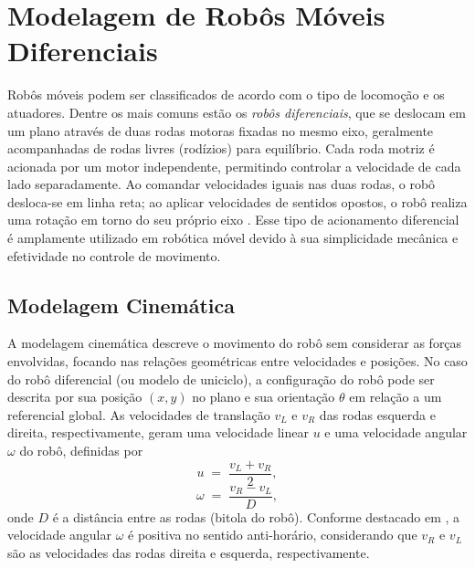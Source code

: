 
\section{Modelagem de Robôs Móveis Diferenciais}
Robôs móveis podem ser classificados de acordo com o tipo de locomoção e os atuadores. Dentre os mais comuns estão os \textit{robôs diferenciais}, que se deslocam em um plano através de duas rodas motoras fixadas no mesmo eixo, geralmente acompanhadas de rodas livres (rodízios) para equilíbrio. Cada roda motriz é acionada por um motor independente, permitindo controlar a velocidade de cada lado separadamente. Ao comandar velocidades iguais nas duas rodas, o robô desloca-se em linha reta; ao aplicar velocidades de sentidos opostos, o robô realiza uma rotação em torno do seu próprio eixo \cite{Sarcinelli-Filho2023_2}. Esse tipo de acionamento diferencial é amplamente utilizado em robótica móvel devido à sua simplicidade mecânica e efetividade no controle de movimento.

\subsection{Modelagem Cinemática}
A modelagem cinemática descreve o movimento do robô sem considerar as forças envolvidas, focando nas relações geométricas entre velocidades e posições. No caso do robô diferencial (ou modelo de uniciclo), a configuração do robô pode ser descrita por sua posição $(x,y)$ no plano e sua orientação $\theta$ em relação a um referencial global. As velocidades de translação $v_L$ e $v_R$ das rodas esquerda e direita, respectivamente, geram uma velocidade linear $u$ e uma velocidade angular $\omega$ do robô, definidas por
\begin{equation}\label{eq:u}
    u \;=\; \frac{v_L + v_R}{2},
\end{equation}
\begin{equation}\label{eq:omega}
    \omega \;=\; \frac{v_R - v_L}{D},
\end{equation}
onde $D$ é a distância entre as rodas (bitola do robô). Conforme destacado em \cite{Sarcinelli-Filho2023_2}, a velocidade angular $\omega$ é positiva no sentido anti-horário, considerando que $v_R$ e $v_L$ são as velocidades das rodas direita e esquerda, respectivamente.

